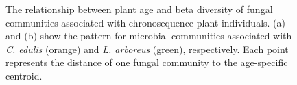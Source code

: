 \clearpage
\begin{figure}[h]
	\centering
	\caption[The relationship between plant age and beta diversity of fungal communities associated with chronosequence plant individuals.]
		{\hspace{1mm} The relationship between plant age and beta diversity of fungal communities associated with chronosequence plant individuals.
		(a) and (b) show the pattern for microbial communities associated with \textit{C. edulis} (orange) and \textit{L. arboreus} (green), respectively. 
		Each point represents the distance of one fungal community to the age-specific centroid.  
		} 
	\label{fig:CombinedFull2015Beta_Individual_SI}
\end{figure}



